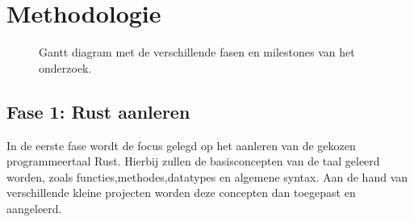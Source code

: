 \section{Methodologie}%
\label{sec:methodologie}





\begin{figure}
    \centering
    \caption{\label{fig:gantt}Gantt diagram met de verschillende fasen en milestones van het onderzoek.}
\end{figure}

\subsection{Fase 1: Rust aanleren}
In de eerste fase wordt de focus gelegd op het aanleren van de gekozen programmeertaal Rust. Hierbij zullen de basisconcepten van de taal geleerd worden, zoals functies,methodes,datatypes en algemene syntax. Aan de hand van verschillende kleine projecten worden deze concepten dan toegepast en aangeleerd.



